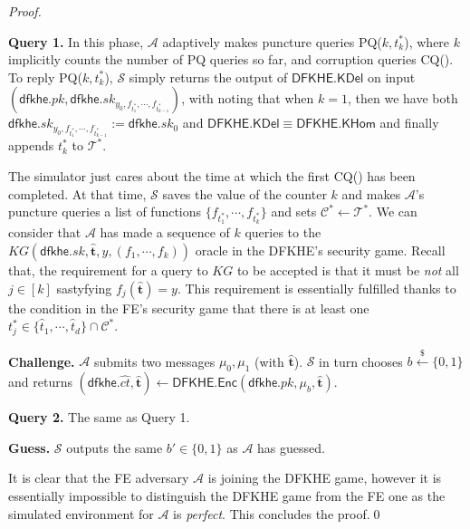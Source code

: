 \documentclass[runningheads,10pt]{llncs}
\begin{document}
\begin{proof}
\begin{description}
		\item \textbf{Query 1.} In this phase, $\mathcal{A}$ adaptively makes puncture queries PQ($k, t^*_k$), 
where $k$ implicitly counts the number of PQ queries so far, and corruption queries CQ().  
To reply  PQ($k, t^*_k$), $\mathcal{S}$ simply returns the output of $\mathsf{DFKHE.KDel}$ on input $(\mathsf{dfkhe}.pk, \mathsf{dfkhe}.sk_{y_0,f_{t^*_1},\cdots, f_{t^*_{k-1}}} )$, with noting that when $k=1$, then we have both $\mathsf{dfkhe}.sk_{y_0,f_{t^*_1},\cdots, f_{t^*_{k-1}}}:=\mathsf{dfkhe}.sk_{0}$ and $\mathsf{DFKHE.KDel}\equiv \mathsf{DFKHE.KHom}$ and finally appends $t^*_k$ to $\mathcal{T}^*$. 
		
		The simulator just cares about the time at which the first CQ() has been completed. At that time, $\mathcal{S}$ saves the value of the counter $k$ and makes $\mathcal{A}$'s puncture queries a list of functions $\{f_{t^*_1},\cdots, f_{t^*_{k}}\}$ and  sets $\mathcal{C}^* \leftarrow \mathcal{T}^* $. We can consider that $\mathcal{A}$ has made a sequence of $k$ queries to the $KG(\mathsf{dfkhe}.sk,\widehat{\mathbf{t}},y,(f_1, \cdots, f_k))$ oracle in the DFKHE's security game. 
Recall that, the requirement for a query to $KG$ to be accepted is that it must be \textit{not} all $j\in [k]$ sastyfying $f_j(\widehat{\mathbf{t}})=y$. This requirement is essentially fulfilled thanks to the condition in the FE's security game that there is at least one $t^*_j\in \{\widehat{t}_1, \cdots, \widehat{t}_d\}\cap \mathcal{C}^*$. 
		
		\item \textbf{Challenge.} 
		$\mathcal{A}$ submits two messages $\mu_0, \mu_1$ (with $\widehat{\mathbf{t}}$). 
		$\mathcal{S}$ in turn chooses $b \xleftarrow{\$} \{0,1\}$ and 
		returns $(\mathsf{dfkhe}.\widehat{ct},\widehat{\mathbf{t}}) \leftarrow \textsf{DFKHE.Enc}(\mathsf{dfkhe}.pk,\mu_b, \widehat{\mathbf{t}})$.  
		\item \textbf{Query 2.} The same as Query 1.%
		\item \textbf{Guess.} $\mathcal{S}$ outputs the same $b'\in \{0,1\}$ as $\mathcal{A}$ has guessed. 
	\end{description}
	
	It is clear that the FE adversary $\mathcal{A}$ is joining the DFKHE game, however it is essentially impossible to distinguish the DFKHE game from the FE one  as the simulated environment for $\mathcal{A}$ is \textit{perfect}.  
This concludes the proof.\qed
\fi 
\end{proof}
\end{document}
